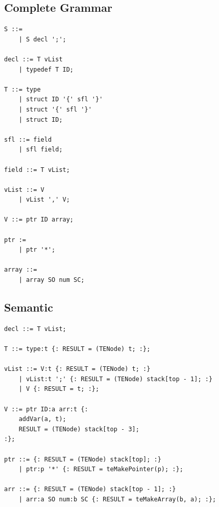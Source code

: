 \subsection{Complete Grammar}
\begin{lstlisting}[frame=single]
S ::=
    | S decl ';';

decl ::= T vList
    | typedef T ID;

T ::= type
    | struct ID '{' sfl '}'
    | struct '{' sfl '}'
    | struct ID;

sfl ::= field
    | sfl field;

field ::= T vList;

vList ::= V
    | vList ',' V;

V ::= ptr ID array;

ptr :=
    | ptr '*';

array ::=
    | array SO num SC;
\end{lstlisting}

\subsection{Semantic}
\begin{lstlisting}[frame=single]
decl ::= T vList;

T ::= type:t {: RESULT = (TENode) t; :};

vList ::= V:t {: RESULT = (TENode) t; :}
    | vList:t ';' {: RESULT = (TENode) stack[top - 1]; :}
    | V {: RESULT = t; :};

V ::= ptr ID:a arr:t {:
    addVar(a, t);
    RESULT = (TENode) stack[top - 3];
:};

ptr ::= {: RESULT = (TENode) stack[top]; :}
    | ptr:p '*' {: RESULT = teMakePointer(p); :};

arr ::= {: RESULT = (TENode) stack[top - 1]; :}
    | arr:a SO num:b SC {: RESULT = teMakeArray(b, a); :};
\end{lstlisting}